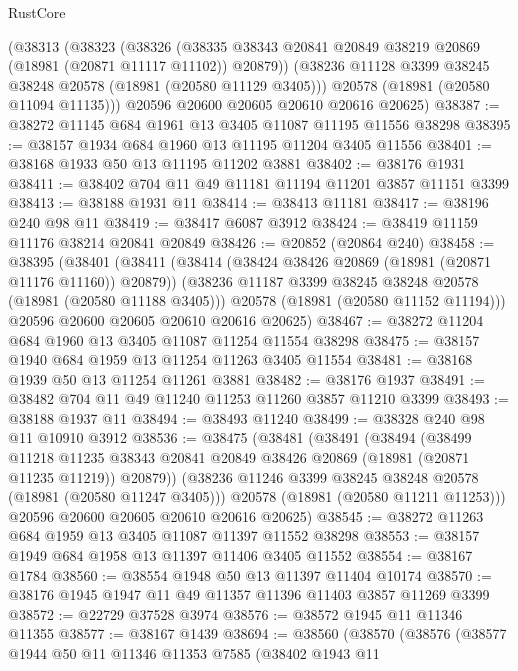 \begin{lexlean}{RustCore}
\begin{coremodule}
    (@38313
      (@38323
        (@38326 (@38335 @38343 @20841 @20849 @38219 @20869 (@18981 (@20871 @11117 @11102)) @20879))
        (@38236 @11128 @3399 @38245 @38248 @20578 (@18981 (@20580 @11129 @3405)))
        @20578
        (@18981 (@20580 @11094 @11135)))
      @20596
      @20600
      @20605
      @20610
      @20616
      @20625)
@38387 := @38272 @11145 @684 @1961 @13 @3405 @11087 @11195 @11556 @38298
@38395 := @38157 @1934 @684 @1960 @13 @11195 @11204 @3405 @11556
@38401 := @38168 @1933 @50 @13 @11195 @11202 @3881
@38402 := @38176 @1931
@38411 := @38402 @704 @11 @49 @11181 @11194 @11201 @3857 @11151 @3399
@38413 := @38188 @1931 @11
@38414 := @38413 @11181
@38417 := @38196 @240 @98 @11
@38419 := @38417 @6087 @3912
@38424 := @38419 @11159 @11176 @38214 @20841 @20849
@38426 := @20852 (@20864 @240)
@38458 := @38395
    (@38401
      (@38411
        (@38414 (@38424 @38426 @20869 (@18981 (@20871 @11176 @11160)) @20879))
        (@38236 @11187 @3399 @38245 @38248 @20578 (@18981 (@20580 @11188 @3405)))
        @20578
        (@18981 (@20580 @11152 @11194)))
      @20596
      @20600
      @20605
      @20610
      @20616
      @20625)
@38467 := @38272 @11204 @684 @1960 @13 @3405 @11087 @11254 @11554 @38298
@38475 := @38157 @1940 @684 @1959 @13 @11254 @11263 @3405 @11554
@38481 := @38168 @1939 @50 @13 @11254 @11261 @3881
@38482 := @38176 @1937
@38491 := @38482 @704 @11 @49 @11240 @11253 @11260 @3857 @11210 @3399
@38493 := @38188 @1937 @11
@38494 := @38493 @11240
@38499 := @38328 @240 @98 @11 @10910 @3912
@38536 := @38475
    (@38481
      (@38491
        (@38494
          (@38499
            @11218
            @11235
            @38343
            @20841
            @20849
            @38426
            @20869
            (@18981 (@20871 @11235 @11219))
            @20879))
        (@38236 @11246 @3399 @38245 @38248 @20578 (@18981 (@20580 @11247 @3405)))
        @20578
        (@18981 (@20580 @11211 @11253)))
      @20596
      @20600
      @20605
      @20610
      @20616
      @20625)
@38545 := @38272 @11263 @684 @1959 @13 @3405 @11087 @11397 @11552 @38298
@38553 := @38157 @1949 @684 @1958 @13 @11397 @11406 @3405 @11552
@38554 := @38167 @1784
@38560 := @38554 @1948 @50 @13 @11397 @11404 @10174
@38570 := @38176 @1945 @1947 @11 @49 @11357 @11396 @11403 @3857 @11269 @3399
@38572 := @22729 @37528 @3974
@38576 := @38572 @1945 @11 @11346 @11355
@38577 := @38167 @1439
@38694 := @38560
    (@38570
      (@38576
        (@38577
          @1944
          @50
          @11
          @11346
          @11353
          @7585
          (@38402
            @1943
            @11

\end{coremodule}
\end{lexlean}
